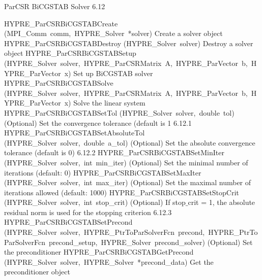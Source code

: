 \documentclass{article}
\begin{document}
\begin{cxxentry}
\begin{cxxentry}
\begin{cxxfunction}
\begin{cxxdoc}
\end{cxxdoc}
\end{cxxfunction}
\end{cxxentry}
\begin{cxxentry}
{}
        {ParCSR BiCGSTAB Solver}
        {}
        {
}
        {6.12}
\begin{cxxnames}
        {HYPRE\_ParCSRBiCGSTABCreate}
        {(MPI\_Comm\ comm,\ HYPRE\_Solver\ *solver)}
        {
Create a solver object}
        {}
\label{cxx.6.12.6}
        {HYPRE\_ParCSRBiCGSTABDestroy}
        {(HYPRE\_Solver\ solver)}
        {
Destroy a solver object}
        {}
\label{cxx.6.12.7}
        {HYPRE\_ParCSRBiCGSTABSetup}
        {(HYPRE\_Solver\ solver,\ HYPRE\_ParCSRMatrix\ A,\ HYPRE\_ParVector\ b,\ HYPRE\_ParVector\ x)}
        {
Set up BiCGSTAB solver}
        {}
\label{cxx.6.12.8}
        {HYPRE\_ParCSRBiCGSTABSolve}
        {(HYPRE\_Solver\ solver,\ HYPRE\_ParCSRMatrix\ A,\ HYPRE\_ParVector\ b,\ HYPRE\_ParVector\ x)}
        {
Solve the linear system}
        {}
\label{cxx.6.12.9}
        {HYPRE\_ParCSRBiCGSTABSetTol}
        {(HYPRE\_Solver\ solver,\ double\ tol)}
        {
(Optional) Set the convergence tolerance (default is 1}
        {6.12.1}
        {HYPRE\_ParCSRBiCGSTABSetAbsoluteTol}
        {(HYPRE\_Solver\ solver,\ double\ a\_tol)}
        {
(Optional) Set the absolute convergence tolerance (default is 0)}
        {6.12.2}
        {HYPRE\_ParCSRBiCGSTABSetMinIter}
        {(HYPRE\_Solver\ solver,\ int\ min\_iter)}
        {
(Optional) Set the minimal number of iterations (default: 0)}
        {}
\label{cxx.6.12.10}
        {HYPRE\_ParCSRBiCGSTABSetMaxIter}
        {(HYPRE\_Solver\ solver,\ int\ max\_iter)}
        {
(Optional) Set the maximal number of iterations allowed (default: 1000)}
        {}
\label{cxx.6.12.11}
        {HYPRE\_ParCSRBiCGSTABSetStopCrit}
        {(HYPRE\_Solver\ solver,\ int\ stop\_crit)}
        {
(Optional) If stop$\_$crit = 1, the absolute residual norm is used
for the stopping criterion}
        {6.12.3}
        {HYPRE\_ParCSRBiCGSTABSetPrecond}
        {(HYPRE\_Solver\ solver,\ HYPRE\_PtrToParSolverFcn\ precond,\ HYPRE\_PtrToParSolverFcn\ precond\_setup,\ HYPRE\_Solver\ precond\_solver)}
        {
(Optional) Set the preconditioner}
        {}
\label{cxx.6.12.12}
        {HYPRE\_ParCSRBiCGSTABGetPrecond}
        {(HYPRE\_Solver\ solver,\ HYPRE\_Solver\ *precond\_data)}
        {
Get the preconditioner object}

\end{cxxnames}
\end{cxxentry}
\end{cxxentry}
\end{document}
